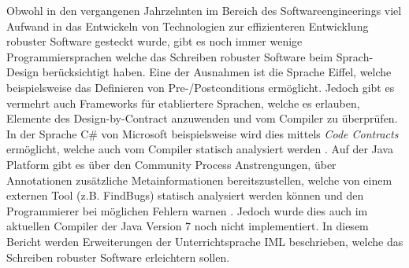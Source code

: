 Obwohl in den vergangenen Jahrzehnten im Bereich des Softwareengineerings viel 
Aufwand in das Entwickeln von Technologien zur effizienteren Entwicklung robuster
Software gesteckt wurde, gibt es noch immer wenige Programmiersprachen welche 
das Schreiben robuster Software beim Sprach-Design berücksichtigt haben. Eine der Ausnahmen 
ist die Sprache Eiffel, welche beispielsweise das Definieren von Pre-/Postconditions
ermöglicht. Jedoch gibt es vermehrt auch Frameworks für etabliertere Sprachen, welche 
es erlauben, Elemente des Design-by-Contract anzuwenden und vom Compiler zu überprüfen.
In der Sprache C\# von Microsoft beispielsweise wird dies mittels \textit{Code Contracts}
 ermöglicht, welche auch vom Compiler statisch analysiert werden \cite{MS:CodeContracts}.
Auf der Java Platform gibt es über den Community Process Anstrengungen, über Annotationen
zusätzliche Metainformationen bereitszustellen, welche von einem externen Tool (z.B. FindBugs) statisch analysiert 
werden können und den Programmierer bei möglichen Fehlern warnen \cite{JSR:305}. Jedoch wurde dies
auch im aktuellen Compiler der Java Version 7 noch nicht implementiert. In diesem Bericht werden Erweiterungen
der Unterrichtsprache IML beschrieben, welche das Schreiben robuster Software erleichtern sollen.

